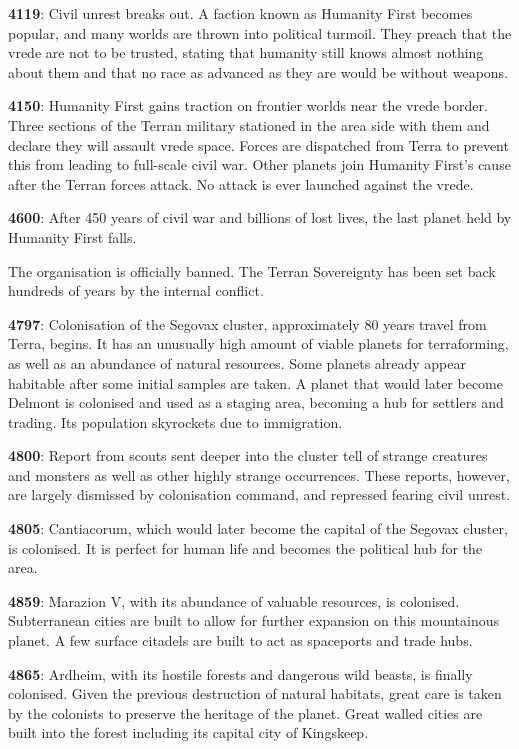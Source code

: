 \textbf{4119}: Civil unrest breaks out. A faction known as Humanity First becomes popular, and many worlds are thrown into political turmoil. They preach that the vrede are not to be trusted, stating that humanity still knows almost nothing about them and that no race as advanced as they are would be without weapons.

\textbf{4150}: Humanity First gains traction on frontier worlds near the vrede border. Three sections of the Terran military stationed in the area side with them and declare they will assault vrede space. Forces are dispatched from Terra to prevent this from leading to full-scale civil war. Other planets join Humanity First's cause after the Terran forces attack. No attack is ever launched against the vrede.

\textbf{4600}: After 450 years of civil war and billions of lost lives, the last planet held by Humanity First falls.

The organisation is officially banned. The Terran Sovereignty has been set back hundreds of years by the internal conflict.

\textbf{4797}: Colonisation of the Segovax cluster, approximately 80 years travel from Terra, begins. It has an unusually high amount of viable planets for terraforming, as well as an abundance of natural resources. Some planets already appear habitable after some initial samples are taken. A planet that would later become Delmont is colonised and used as a staging area, becoming a hub for settlers and trading. Its population skyrockets due to immigration.

\textbf{4800}: Report from scouts sent deeper into the cluster tell of strange creatures and monsters as well as other highly strange occurrences. These reports, however, are largely dismissed by colonisation command, and repressed fearing civil unrest.

\textbf{4805}: Cantiacorum, which would later become the capital of the Segovax cluster, is colonised. It is perfect for human life and becomes the political hub for the area.

\textbf{4859}: Marazion V, with its abundance of valuable resources, is colonised. Subterranean cities are built to allow for further expansion on this mountainous planet. A few surface citadels are built to act as spaceports and trade hubs.

\textbf{4865}: Ardheim, with its hostile forests and dangerous wild beasts, is finally colonised. Given the previous destruction of natural habitats, great care is taken by the colonists to preserve the heritage of the planet. Great walled cities are built into the forest including its capital city of Kingskeep.

